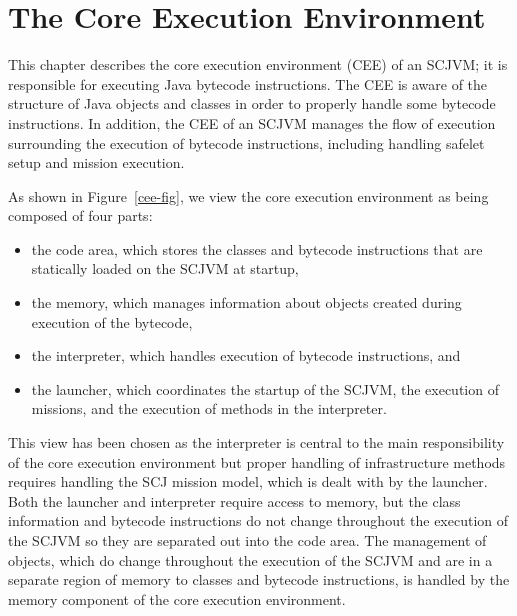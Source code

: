 \chapter{The Core Execution Environment}
\label{cee-chapter}

This chapter describes the core execution environment (CEE) of an
SCJVM; it is responsible for executing Java bytecode instructions.
The CEE is aware of the structure of Java objects
and classes in order to properly handle some bytecode instructions.
In addition, the CEE of an SCJVM manages the flow of execution surrounding the
execution of bytecode instructions, including handling safelet setup
and mission execution.

As shown in Figure~\ref{cee-fig}, we view the core execution
environment as being composed of four parts:
\begin{itemize}
\item the code area, which stores the classes and bytecode
  instructions that are statically loaded on the SCJVM at startup,
\item the memory, which manages information about objects created
  during execution of the bytecode,
\item the interpreter, which handles execution of bytecode
  instructions, and
\item the launcher, which coordinates the startup of the SCJVM, the
  execution of missions, and the execution of methods in the
  interpreter.
\end{itemize}
This view has been chosen as the interpreter is central to the main
responsibility of the core execution environment but proper handling
of infrastructure methods requires handling the SCJ mission model,
which is dealt with by the launcher.
Both the launcher and interpreter require access to memory, but the
class information and bytecode instructions do not change throughout
the execution of the SCJVM so they are separated out into the code
area.
The management of objects, which do change throughout the execution of
the SCJVM and are in a separate region of memory to classes and
bytecode instructions, is handled by the memory component of the core
execution environment.

